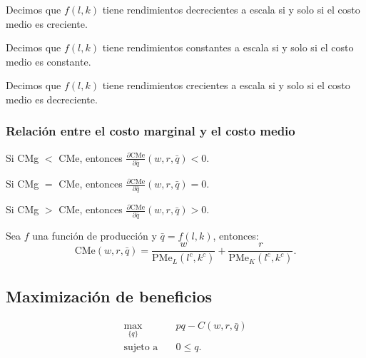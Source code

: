 \documentclass[8pt,a4paper]{extarticle}
\begin{document}
\begin{multicols}{3}
\begin{boxprop}
	Decimos que $f(l, k)$ tiene rendimientos decrecientes a escala si y solo si el costo medio es creciente.
\end{boxprop}

\begin{boxprop}                                                                                                                                  
    Decimos que $f(l, k)$ tiene rendimientos constantes a escala si y solo si el costo medio es constante.        
\end{boxprop}

\begin{boxprop}                                                                                                                                  
    Decimos que $f(l, k)$ tiene rendimientos crecientes a escala si y solo si el costo medio es decreciente.        
\end{boxprop}

\subsubsection*{Relación entre el costo marginal y el costo medio}

\begin{eqlist}
\item Si CMg $<$ CMe, entonces $\displaystyle \frac{\partial \text{CMe}}{\partial \bar{q}} (w, r, \bar{q}) < 0$.
\item Si CMg $=$ CMe, entonces $\displaystyle \frac{\partial \text{CMe}}{\partial \bar{q}} (w, r, \bar{q}) = 0$.
\item Si CMg $>$ CMe, entonces $\displaystyle \frac{\partial \text{CMe}}{\partial \bar{q}} (w, r, \bar{q}) > 0$.
\end{eqlist}

\begin{boxcor}
	Sea $f$ una función de producción y $\bar{q} = f(l, k)$, entonces:
	\[
		\text{CMe} (w, r, \bar{q}) = \frac{w}{\text{PMe}_L (l^c, k^c)} + \frac{r}{\text{PMe}_K (l^c, k^c)}
	.\] 
\end{boxcor}

\newpage

\subsection{Maximización de beneficios}

\begin{equation*}
\begin{aligned}
	\max_{\{q\}}\         & pq - C(w, r, \bar{q}) \\
    \text{sujeto a} \quad & 0 \le q.
\end{aligned}
\end{equation*}


\end{multicols}
\end{document}
